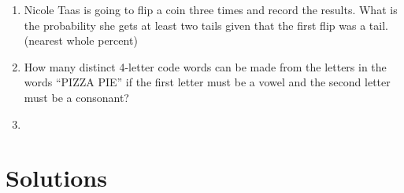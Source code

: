\documentclass[../uilmath.tex]{subfiles}
\begin{document}
\begin{enumerate}[label=\bfseries\arabic*.]
    \item %
    Nicole Taas is going to flip a coin three times and record the results. What is the probability she gets at least two tails given that the first flip was a tail. (nearest whole percent)

    \item %
    How many distinct 4-letter code words can be made from the letters in the words ``PIZZA PIE'' if the first letter must be a vowel and the second letter must be a consonant?

    \item %
    
\end{enumerate}
\section*{Solutions}
\end{document}
